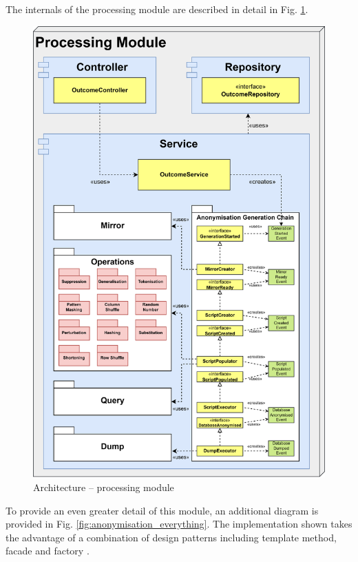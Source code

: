 \documentclass[a4paper,twoside,12pt]{book}
\begin{document}
The internals of the processing module are described in detail in Fig. \ref{fig:architecture_processing}.
%
\begin{figure}
  \centering
  \includegraphics[width=\linewidth]{img/architecture_processing.png}
  \caption{Architecture – processing module}
  \label{fig:architecture_processing}
\end{figure}
%
To provide an even greater detail of this module, an additional diagram is provided in Fig. \ref{fig:anonymisation_everything}. The implementation shown takes the advantage of a combination of design patterns including template method, facade and factory \cite{bib:gamma}.
\end{document}
